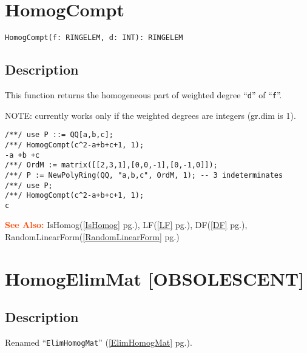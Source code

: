 \documentclass[a4paper]{mybook}
\newenvironment{command}{}{} %
\newcommand\SeeAlso{\par\textcolor{OrangeRed}{\textbf{\large See Also: }}}
\begin{document}
\section{HomogCompt}
\label{HomogCompt}
\begin{command} %


\begin{Verbatim}[label=syntax, rulecolor=\color{MidnightBlue},
frame=single]
HomogCompt(f: RINGELEM, d: INT): RINGELEM
\end{Verbatim}


\subsection*{Description}

This function returns the homogeneous part of weighted degree ``\verb&d&'' of ``\verb&f&''.
\par 
NOTE: currently works only if the weighted degrees are integers (gr.dim is 1).
\begin{Verbatim}[label=example, rulecolor=\color{PineGreen}, frame=single]
/**/ use P ::= QQ[a,b,c];
/**/ HomogCompt(c^2-a+b+c+1, 1);
-a +b +c
/**/ OrdM := matrix([[2,3,1],[0,0,-1],[0,-1,0]]);
/**/ P := NewPolyRing(QQ, "a,b,c", OrdM, 1); -- 3 indeterminates
/**/ use P;
/**/ HomogCompt(c^2-a+b+c+1, 1);
c
\end{Verbatim}


\SeeAlso %
  IsHomog(\ref{IsHomog} pg.\pageref{IsHomog}), 
    LF(\ref{LF} pg.\pageref{LF}), 
    DF(\ref{DF} pg.\pageref{DF}), 
    RandomLinearForm(\ref{RandomLinearForm} pg.\pageref{RandomLinearForm})
\end{command} %

\section{HomogElimMat [OBSOLESCENT]}
\label{HomogElimMat [OBSOLESCENT]}
\begin{command} %



\subsection*{Description}

Renamed ``\verb&ElimHomogMat&'' (\ref{ElimHomogMat} pg.\pageref{ElimHomogMat}).

\end{command} %
\end{document}
